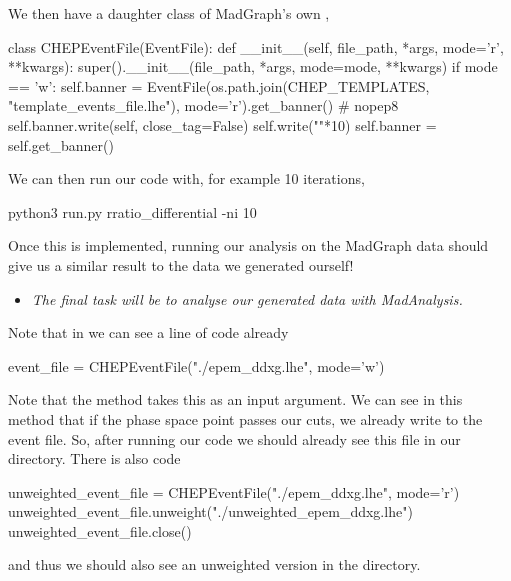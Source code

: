 We then have a daughter class of MadGraph's own ,
\begin{codeenv}
    
class CHEPEventFile(EventFile):
    def __init__(self, file_path, *args, mode='r', **kwargs):
        super().__init__(file_path, *args, mode=mode, **kwargs)
        if mode == 'w':
            self.banner = EventFile(os.path.join(CHEP_TEMPLATES, 
            "template_events_file.lhe"), mode='r').get_banner()  # nopep8
            self.banner.write(self, close_tag=False)
            self.write("\n"*10)
        self.banner = self.get_banner()
\end{codeenv}

We can then run our code with, for example 10 iterations, 
\begin{codeenv}
    python3 run.py rratio_differential -ni 10
\end{codeenv}
Once this is implemented, running our analysis on the MadGraph data should give us a similar result to the data we generated ourself!

\begin{itemize}
    \item \textit{The final task will be to analyse our generated data with MadAnalysis.}
\end{itemize}
Note that in  we can see a line of code already
\begin{codeenv}
        event_file = CHEPEventFile("./epem_ddxg.lhe", mode='w')
\end{codeenv}
Note that the  method takes this as an input argument. We can see in this method that if the phase space point passes our cuts, we already write to the event file. So, after running our code we should already see this file in our directory. There is also code
\begin{codeenv}
        unweighted_event_file = CHEPEventFile("./epem_ddxg.lhe", mode='r')
    unweighted_event_file.unweight("./unweighted_epem_ddxg.lhe")
    unweighted_event_file.close()
\end{codeenv}
and thus we should also see an unweighted version in the directory.

